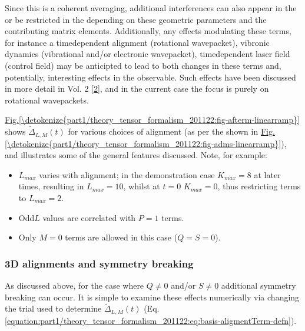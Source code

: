\documentclass[letterpaper,table,10pt,english]{jupyterBook}
\begin{document}
\sphinxAtStartPar
Since this is a coherent averaging, additional interferences can also appear in the {\hyperref[\detokenize{backmatter/glossary:term-AF}]{}} \sphinxhyphen{} or be restricted in the {\hyperref[\detokenize{backmatter/glossary:term-AF}]{}} \sphinxhyphen{} depending on these geometric parameters and the contributing matrix elements. Additionally, any effects modulating these terms, for instance a time\sphinxhyphen{}dependent alignment (rotational wavepacket), vibronic dynamics (vibrational and/or electronic wavepacket), time\sphinxhyphen{}dependent laser field (control field) may be anticipted to lead to both changes in these terms and, potentially, interesting effects in the observable. Such effects have been discussed in more detail in  Vol. 2 {[}\hyperlink{cite.backmatter/bibliography:id614}{2}{]}, and in the current case the focus is purely on rotational wavepackets.

\sphinxAtStartPar
\hyperref[\detokenize{part1/theory_tensor_formalism_201122:fig-afterm-linearramp}]{Fig.\@ \ref{\detokenize{part1/theory_tensor_formalism_201122:fig-afterm-linearramp}}} shows \(\tilde{\Delta}_{L,M}(t)\) for various choices of alignment (as per the {\hyperref[\detokenize{backmatter/glossary:term-ADMs}]{}} shown in \hyperref[\detokenize{part1/theory_tensor_formalism_201122:fig-adms-linearramp}]{Fig.\@ \ref{\detokenize{part1/theory_tensor_formalism_201122:fig-adms-linearramp}}}), and illustrates some of the general features discussed. Note, for example:
\begin{itemize}
\item {} 
\sphinxAtStartPar
\(L_{max}\) varies with alignment; in the demonstration case \(K_{max}=8\) at later times, resulting in \(L_{max}=10\), whilst at \(t=0\) \(K_{max}=0\), thus restricting terms to \(L_{max}=2\).

\item {} 
\sphinxAtStartPar
Odd\sphinxhyphen{}\(L\) values are correlated with \(P=1\) terms.

\item {} 
\sphinxAtStartPar
Only \(M=0\) terms are allowed in this case (\(Q=S=0\)).

\end{itemize}


\subsubsection{3D alignments and symmetry breaking}
\label{\detokenize{part1/theory_tensor_formalism_201122:d-alignments-and-symmetry-breaking}}\label{\detokenize{part1/theory_tensor_formalism_201122:sec-theory-af-alignment-term-3d}}
\sphinxAtStartPar
As discussed above, for the case where \(Q\neq0\) and/or \(S\neq0\) additional symmetry breaking can occur. It is simple to examine these effects numerically via changing the trial {\hyperref[\detokenize{backmatter/glossary:term-ADMs}]{}} used to determine \(\tilde{\Delta}_{L,M}(t)\) (Eq. \eqref{equation:part1/theory_tensor_formalism_201122:eq:basis-aligmentTerm-defn}).
\end{document}
